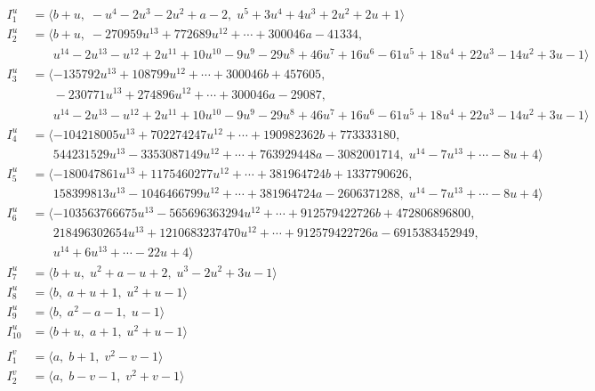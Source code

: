 \documentclass[1p]{elsarticle_modified}
\theoremstyle{definition}
\begin{document}
\begin{align*}
I^u_{1}&=\langle 
b+u,\;- u^4-2 u^3-2 u^2+a-2,\;u^5+3 u^4+4 u^3+2 u^2+2 u+1\rangle \\
I^u_{2}&=\langle 
b+u,\;-270959 u^{13}+772689 u^{12}+\cdots+300046 a-41334,\\
\phantom{I^u_{2}}&\phantom{= \langle  }u^{14}-2 u^{13}- u^{12}+2 u^{11}+10 u^{10}-9 u^9-29 u^8+46 u^7+16 u^6-61 u^5+18 u^4+22 u^3-14 u^2+3 u-1\rangle \\
I^u_{3}&=\langle 
-135792 u^{13}+108799 u^{12}+\cdots+300046 b+457605,\\
\phantom{I^u_{3}}&\phantom{= \langle  }-230771 u^{13}+274896 u^{12}+\cdots+300046 a-29087,\\
\phantom{I^u_{3}}&\phantom{= \langle  }u^{14}-2 u^{13}- u^{12}+2 u^{11}+10 u^{10}-9 u^9-29 u^8+46 u^7+16 u^6-61 u^5+18 u^4+22 u^3-14 u^2+3 u-1\rangle \\
I^u_{4}&=\langle 
-104218005 u^{13}+702274247 u^{12}+\cdots+190982362 b+773333180,\\
\phantom{I^u_{4}}&\phantom{= \langle  }544231529 u^{13}-3353087149 u^{12}+\cdots+763929448 a-3082001714,\;u^{14}-7 u^{13}+\cdots-8 u+4\rangle \\
I^u_{5}&=\langle 
-180047861 u^{13}+1175460277 u^{12}+\cdots+381964724 b+1337790626,\\
\phantom{I^u_{5}}&\phantom{= \langle  }158399813 u^{13}-1046466799 u^{12}+\cdots+381964724 a-2606371288,\;u^{14}-7 u^{13}+\cdots-8 u+4\rangle \\
I^u_{6}&=\langle 
-103563766675 u^{13}-565696363294 u^{12}+\cdots+912579422726 b+472806896800,\\
\phantom{I^u_{6}}&\phantom{= \langle  }218496302654 u^{13}+1210683237470 u^{12}+\cdots+912579422726 a-6915383452949,\\
\phantom{I^u_{6}}&\phantom{= \langle  }u^{14}+6 u^{13}+\cdots-22 u+4\rangle \\
I^u_{7}&=\langle 
b+u,\;u^2+a- u+2,\;u^3-2 u^2+3 u-1\rangle \\
I^u_{8}&=\langle 
b,\;a+u+1,\;u^2+u-1\rangle \\
I^u_{9}&=\langle 
b,\;a^2- a-1,\;u-1\rangle \\
I^u_{10}&=\langle 
b+u,\;a+1,\;u^2+u-1\rangle \\
\\
I^v_{1}&=\langle 
a,\;b+1,\;v^2- v-1\rangle \\
I^v_{2}&=\langle 
a,\;b- v-1,\;v^2+v-1\rangle \\
\end{align*}
\end{document}

